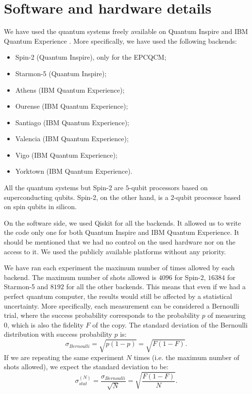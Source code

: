 \section{Software and hardware details}
We have used the quantum systems freely available on Quantum Inspire \cite{quantuminspire} and IBM Quantum Experience \cite{ibmquantumexperience}.
More specifically, we have used the following backends:
\begin{itemize}
    \item Spin-2 (Quantum Inspire), only for the EPCQCM;
    \item Starmon-5 (Quantum Inspire);
    \item Athens (IBM Quantum Experience);
    \item Ourense (IBM Quantum Experience);
    \item Santiago (IBM Quantum Experience);
    \item Valencia (IBM Quantum Experience);
    \item Vigo (IBM Quantum Experience);
    \item Yorktown (IBM Quantum Experience).
\end{itemize}
All the quantum systems but Spin-2 are $5$-qubit processors based on superconducting qubits.
Spin-2, on the other hand, is a $2$-qubit processor based on spin qubits in silicon.

On the software side, we used Qiskit \cite{Qiskit} for all the backends. 
It allowed us to write the code only one for both Quantum Inspire and IBM Quantum Experience.
It should be mentioned that we had no control on the used hardware nor on the access to it.
We used the publicly available platforms without any priority.

We have ran each experiment the maximum number of times allowed by each backend.
The maximum number of shots allowed is $4096$ for Spin-2, $16384$ for Starmon-5 and $8192$ for all the other backends.
This means that even if we had a perfect quantum computer, the results would still be affected by a statistical uncertainty.
More specifically, each measurement can be considered a Bernoulli trial, where the success probability corresponds to the probability $p$ of measuring $0$, which is also the fidelity $F$ of the copy.
The standard deviation of the Bernoulli distribution with success probability $p$ is:
\[
    \sigma_{Bernoulli}=\sqrt{p(1-p)}=\sqrt{F(1-F)}.
\]
If we are repeating the same experiment $N$ times (i.e. the maximum number of shots allowed), we expect the standard deviation to be:
\begin{equation}
    \sigma_{stat}^{(N)}=\frac{\sigma_{Bernoulli}}{\sqrt{N}}=\sqrt{\frac{F(1-F)}{N}}.
\end{equation}

